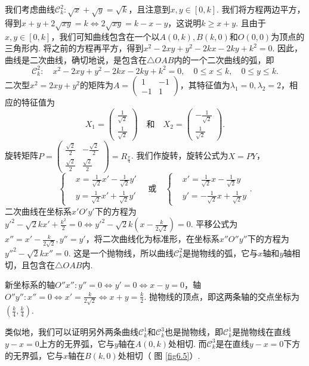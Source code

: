 \begin{solution}
  我们考虑曲线$\mathscr C_k^2:\sqrt x+\sqrt y=\sqrt k$，且注意到$x,y\in[0,k]$. 我们将方程两边平方，得到$x+y+2\sqrt{xy}=k\Leftrightarrow 2\sqrt{xy}=k-x-y$，这说明$k\ge x+y$. 且由于$x,y\in[0,k]$，我们可知曲线包含在一个以$A(0,k),B(k,0)$和$O(0,0)$为顶点的三角形内. 将之前的方程再平方，得到$x^2-2xy+y^2-2kx-2ky+k^2=0$. 因此，曲线是二次曲线，确切地说，是包含在$\triangle OAB$内的一个二次曲线的弧，即
  \[
    \mathscr C_k^2:\quad x^2 - 2xy + y^2 - 2kx - 2ky + k^2 = 0,\quad 0\le x\le k,\quad 0\le y\le k.
  \]
  二次型$x^2=2xy+y^2$的矩阵为$A=\begin{pmatrix}
    1 & -1\\
    -1 & 1
  \end{pmatrix}$，其特征值为$\lambda_1=0,\lambda_2=2$，相应的特征值为
  \[
    X_1 = \begin{pmatrix}
      \frac1{\sqrt2} \\
      \frac1{\sqrt2}
    \end{pmatrix} \quad \text{和} \quad
    X_2 = \begin{pmatrix}
      -\frac1{\sqrt2} \\
      \frac1{\sqrt2}
    \end{pmatrix}.
  \]
  旋转矩阵$P=\begin{pmatrix}
    \frac{\sqrt2}2 & - \frac{\sqrt2}2 \\
    \frac{\sqrt2}2 & \frac{\sqrt2}2
  \end{pmatrix}=R_{\frac\pi4}$. 我们作旋转，旋转公式为$X=PY$，
  \[
    \left\{
      \begin{aligned}
        & x = \frac1{\sqrt2}x' - \frac1{\sqrt2}y' \\
        & y = \frac1{\sqrt2}x' + \frac1{\sqrt2}y'
      \end{aligned}
    \right. \quad \text{或} \quad
    \left\{
      \begin{aligned}
        & x' = \frac1{\sqrt2}x - \frac1{\sqrt2}y \\
        & y' = -\frac1{\sqrt2}x + \frac1{\sqrt2}y
      \end{aligned}
    \right..
  \]
  二次曲线在坐标系$x'O'y'$下的方程为$y'^2-\sqrt2kx'+\frac{k^2}2=0\Leftrightarrow y'^2-\sqrt2k\left(x-\frac k{2\sqrt2}\right)=0$. 平移公式为$x''=x'-\frac k{2\sqrt2},y''=y'$，将二次曲线化为标准形，在坐标系$x''O''y''$下的方程为$y''^2-\sqrt2kx''=0$. 这是一个抛物线，所以曲线$\mathscr C_k^2$是抛物线的弧，它与$x$轴和$y$轴相切，且包含在$\triangle OAB$内.

  新坐标系的轴$O''x'':y''=0\Leftrightarrow y'=0\Leftrightarrow x-y=0$，轴$O''y'':x''=0\Leftrightarrow x'=\frac k{2\sqrt2}\Leftrightarrow x+y=\frac k2$. 抛物线的顶点，即这两条轴的交点坐标为$\left(\frac k4,\frac k4\right)$.

  类似地，我们可以证明另外两条曲线$\mathscr C_k^1$和$\mathscr C_k^3$也是抛物线，即$\mathscr C_k^1$是抛物线在直线$y-x=0$上方的无界弧，它与$y$轴在$A(0,k)$处相切. 而$\mathscr C_k^3$是在直线$y-x=0$下方的无界弧，它与$x$轴在$B(k,0)$处相切（ 图 \ref{fig6.5}）.
\end{solution}


